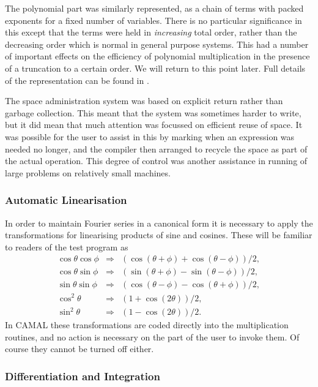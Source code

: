 The polynomial part was similarly represented, as a chain of terms
with packed exponents for a fixed number of variables.  There is no
particular significance in this except that the terms were held in
\emph{increasing} total order, rather than the decreasing order which
is normal in general purpose systems.  This had a number of important
effects on the efficiency of polynomial multiplication in the presence
of a truncation to a certain order.  We will return to this point
later.  Full details of the representation can be found in
\cite{Fitch:LN75}.

The space administration system was based on explicit return rather
than garbage collection.  This meant that the system was sometimes
harder to write, but it did mean that much attention was focussed on
efficient reuse of space.  It was possible for the user to assist in
this by marking when an expression was needed no longer, and the
compiler then arranged to recycle the space as part of the actual
operation.  This degree of control was another assistance in running
of large problems on relatively small machines.

\subsubsection{Automatic Linearisation}

In order to maintain Fourier series in a canonical form it is
necessary to apply the transformations for linearising products of
sine and cosines.  These will be familiar to readers of the \REDUCE
test program as
\begin{eqnarray}
\cos \theta \cos \phi & \Rightarrow &
                (\cos(\theta+\phi)+\cos(\theta-\phi))/2, \\
\cos \theta \sin \phi & \Rightarrow &
                (\sin(\theta+\phi)-\sin(\theta-\phi))/2, \\
\sin \theta \sin \phi & \Rightarrow &
                (\cos(\theta-\phi)-\cos(\theta+\phi))/2, \\
\cos^2 \theta & \Rightarrow & (1+\cos(2\theta))/2,      \\
\sin^2 \theta & \Rightarrow & (1-\cos(2\theta))/2.
\end{eqnarray}
In CAMAL these transformations are coded directly into the
multiplication routines, and no action is necessary on the part of the
user to invoke them.  Of course they cannot be turned off either.

\subsubsection{Differentiation and Integration}

